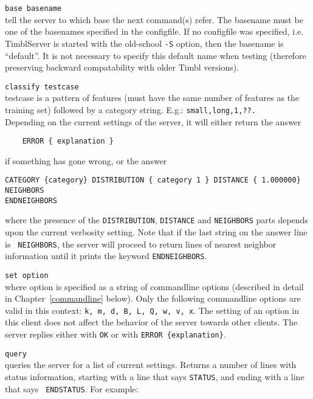 \documentclass{report}
\begin{document}
\begin{description}
\item {\tt base basename}\\
  tell the server to which base the next command(s) refer. The
  basename must be one of the basenames specified in the configfile.
  If no configfile was specified, i.e. TimblServer is
  started with the old-school {\tt -S} option, then the basename is
  ``default''. It is not necessary to specify this default name when
  testing (therefore preserving backward compatability with older
  Timbl versions).

\item {\tt classify testcase}\\
  testcase is a pattern of features (must have the same number of
  features as the training set) followed by a category
  string. E.g.: {\tt small,long,1,??.}\\
  Depending on the current settings of the server, it will either
  return the answer
      \begin{verbatim}
	ERROR { explanation }
      \end{verbatim}
      if something has gone wrong, or the answer
      \begin{verbatim}
CATEGORY {category} DISTRIBUTION { category 1 } DISTANCE { 1.000000} NEIGHBORS
ENDNEIGHBORS
      \end{verbatim}
      where the presence of the {\tt DISTRIBUTION}, {\tt DISTANCE} and
      {\tt NEIGHBORS} parts depends upon the current verbosity
      setting. Note that if the last string on the answer line is {\tt
        NEIGHBORS}, the server will proceed to return lines of nearest
      neighbor information until it prints the keyword {\tt ENDNEIGHBORS}.
\item {\tt set option}\\ where option is specified as a string of
      commandline options (described in detail in
      Chapter~\ref{commandline} below). Only the following commandline
      options are valid in this context: {\tt k, m, d, B, L, Q, w, v,
      x}. The setting of an option in this client does not affect the
      behavior of the server towards other clients. The server replies
      either with {\tt OK} or with {\tt ERROR \{explanation\}}.
    \item {\tt query}\\
      queries the server for a list of current settings. Returns a
      number of lines with status information, starting with a line
      that says {\tt STATUS}, and ending with a line that says {\tt
        ENDSTATUS}. For example:


\end{description}
\end{document}
